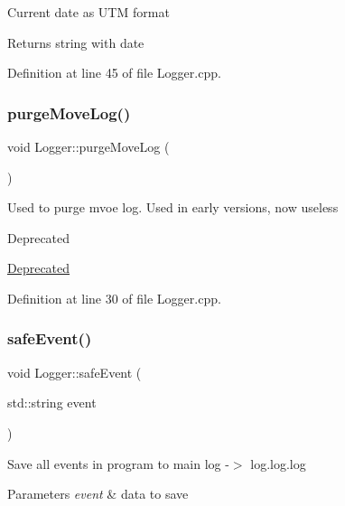 Current date as U\+TM format \begin{DoxyReturn}{Returns}
string with date 
\end{DoxyReturn}


Definition at line 45 of file Logger.\+cpp.

\mbox{\label{classLogger_a69ca833f3e3643333d718f0cce464f9b}} 
\subsubsection{\texorpdfstring{purge\+Move\+Log()}{purgeMoveLog()}}
{\footnotesize\ttfamily void Logger\+::purge\+Move\+Log (\begin{DoxyParamCaption}{ }\end{DoxyParamCaption})\hspace{0.3cm}{\ttfamily [static]}}

Used to purge mvoe log. Used in early versions, now useless \begin{DoxyRefDesc}{Deprecated}
\item[\hyperlink{deprecated__deprecated000001}{Deprecated}]\end{DoxyRefDesc}


Definition at line 30 of file Logger.\+cpp.

\mbox{\label{classLogger_ad2156c976610010c579352c9aeb4b388}} 
\subsubsection{\texorpdfstring{safe\+Event()}{safeEvent()}}
{\footnotesize\ttfamily void Logger\+::safe\+Event (\begin{DoxyParamCaption}\item[{std\+::string}]{event }\end{DoxyParamCaption})\hspace{0.3cm}{\ttfamily [static]}}

Save all events in program to main log -\/$>$ log.\+log.\+log 
\begin{DoxyParams}{Parameters}
{\em event} & data to save \\
\hline
\end{DoxyParams}


